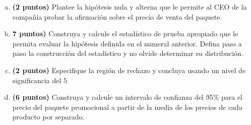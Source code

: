 \documentclass[../main.tex]{subfiles}
\begin{document}
\begin{enumerate}[(a)]

\item \textbf{(2 puntos)} Plantee la hipótesis nula y alterna que le permite al CEO de la compañía probar la afirmación sobre el precio de venta del paquete.

\item \textbf{7 puntos)} Construya y calcule el estadístico de prueba apropiado que le permita evaluar la hipótesis definida en el numeral anterior. Defina paso a paso la construcción del estadístico y no olvide determinar su distribución.

\item \textbf{(2 puntos)} Especifique la región de rechazo y concluya usando un nivel de significancia del 5%

\item \textbf{(6 puntos)} Construya y calcule un intervalo de confianza del 95\% para el precio del paquete promocional a partir de la media de los precios de cada producto por separado.

\end{enumerate}
\end{document}
